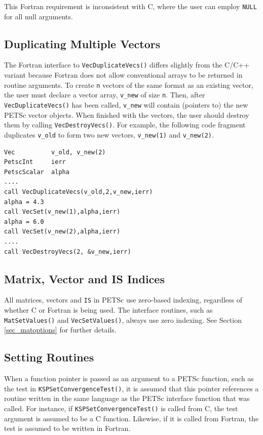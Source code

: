 This Fortran requirement is inconsistent with C, where the
user can employ \lstinline{NULL} for all null arguments.

\subsection{Duplicating Multiple Vectors}
\label{sec_fortvecd}

The Fortran interface to \lstinline{VecDuplicateVecs()} differs slightly
from the C/C++ variant because Fortran does not allow conventional arrays to be
returned in routine arguments.  To create \lstinline{n} vectors of the same
format as an existing vector, the user must declare a vector array,
\lstinline{v_new} of size \lstinline{n}.  Then, after \lstinline{VecDuplicateVecs()} has
been called, \lstinline{v_new} will contain (pointers to) the new PETSc
vector objects.  When finished with the vectors, the user should
destroy them by calling \lstinline{VecDestroyVecs()}.
For example, the following code fragment
duplicates \lstinline{v_old} to form two new vectors, \lstinline{v_new(1)} and \lstinline{v_new(2)}.
\begin{lstlisting}
Vec          v_old, v_new(2)
PetscInt     ierr
PetscScalar  alpha
....
call VecDuplicateVecs(v_old,2,v_new,ierr)
alpha = 4.3
call VecSet(v_new(1),alpha,ierr)
alpha = 6.0
call VecSet(v_new(2),alpha,ierr)
....
call VecDestroyVecs(2, &v_new,ierr)
\end{lstlisting}

\subsection{Matrix, Vector and IS Indices}

All matrices, vectors and \lstinline{IS} in PETSc use zero-based indexing, regardless
of whether C or Fortran is being used.  The interface routines, such
as \lstinline{MatSetValues()} and \lstinline{VecSetValues()}, always use zero
indexing.  See Section \ref{sec_matoptions} for further details.

\subsection{Setting Routines}

When a function pointer is passed as an argument to a PETSc function, such as
the test in \lstinline{KSPSetConvergenceTest()}, it is assumed that this pointer references
a routine written in the same language as the PETSc interface function that was
called. For instance, if \lstinline{KSPSetConvergenceTest()} is called from C, the test
argument is assumed to be a C function. Likewise, if it is called from Fortran,
the test is assumed to be written in Fortran.

